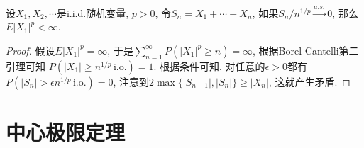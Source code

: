 \documentclass[cn, 12pt, math=mtpro2, bibstyle=apa, blue, twocol]{elegantbook}
\begin{document}
\begin{example}[上述定理的逆命题]
设$X_1,X_2,\cdots$是i.i.d.随机变量, $p>0$, 令$S_n=X_1+\cdots+X_n$, 如果$S_n/n^{1/p}\xrightarrow{a.s.}0$, 那么$E|X_1|^p<\infty$.
\end{example}
\begin{proof}
  假设$E|X_1|^p=\infty$, 于是$\sum_{n=1}^{\infty} P(|X_1|^p\geq n)=\infty$, 根据Borel-Cantelli第二引理可知
  $P(|X_1|\geq n^{1/p}\,\text{i.o.})=1$. 根据条件可知, 对任意的$\epsilon>0$都有$P(|S_n|>\epsilon n^{1/p}\,\text{i.o.})=0$, 注意到$2\max\{|S_{n-1}|,|S_n|\}\geq |X_n|$, 这就产生矛盾.

\end{proof}


\chapter{中心极限定理}
\end{document}
